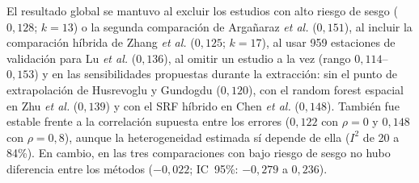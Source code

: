 \documentclass[conference]{IEEEtran}
\begin{document}
El resultado global se mantuvo al excluir los estudios con alto riesgo de sesgo ($0{,}128$; $k=13$) o la segunda comparación de Argañaraz \textit{et al.} ($0{,}151$), al incluir la comparación híbrida de Zhang \textit{et al.} ($0{,}125$; $k=17$), al usar 959 estaciones de validación para Lu \textit{et al.} ($0{,}136$), al omitir un estudio a la vez (rango $0{,}114$--$0{,}153$) y en las sensibilidades propuestas durante la extracción: sin el punto de extrapolación de Husrevoglu y Gundogdu ($0{,}120$), con el random forest espacial en Zhu \textit{et al.} ($0{,}139$) y con el SRF híbrido en Chen \textit{et al.} ($0{,}148$). También fue estable frente a la correlación supuesta entre los errores ($0{,}122$ con $\rho=0$ y $0{,}148$ con $\rho=0{,}8$), aunque la heterogeneidad estimada sí depende de ella ($I^2$ de 20 a 84\%). En cambio, en las tres comparaciones con bajo riesgo de sesgo no hubo diferencia entre los métodos ($-0{,}022$; IC~95\%: $-0{,}279$ a $0{,}236$).
\end{document}
